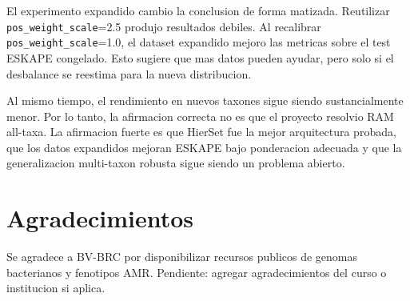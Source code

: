 \documentclass[journal,transmag]{../ieee_latex_template/IEEEtran}
\begin{document}
El experimento expandido cambio la conclusion de forma matizada. Reutilizar \texttt{pos\_weight\_scale}=2.5 produjo resultados debiles. Al recalibrar \texttt{pos\_weight\_scale}=1.0, el dataset expandido mejoro las metricas sobre el test ESKAPE congelado. Esto sugiere que mas datos pueden ayudar, pero solo si el desbalance se reestima para la nueva distribucion.

Al mismo tiempo, el rendimiento en nuevos taxones sigue siendo sustancialmente menor. Por lo tanto, la afirmacion correcta no es que el proyecto resolvio RAM all-taxa. La afirmacion fuerte es que HierSet fue la mejor arquitectura probada, que los datos expandidos mejoran ESKAPE bajo ponderacion adecuada y que la generalizacion multi-taxon robusta sigue siendo un problema abierto.

\section*{Agradecimientos}
Se agradece a BV-BRC por disponibilizar recursos publicos de genomas bacterianos y fenotipos AMR. Pendiente: agregar agradecimientos del curso o institucion si aplica.



\end{document}
